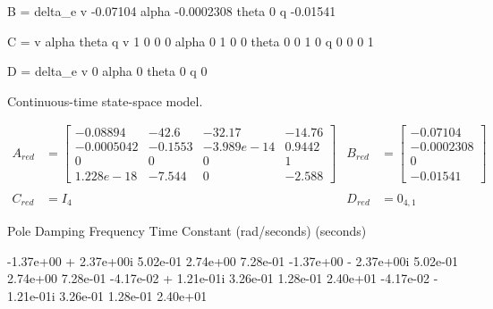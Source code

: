   B = 
             delta_e
   v        -0.07104
   alpha  -0.0002308
   theta           0
   q        -0.01541
 
  C = 
              v  alpha  theta      q
   v          1      0      0      0
   alpha      0      1      0      0
   theta      0      0      1      0
   q          0      0      0      1
 
  D = 
          delta_e
   v            0
   alpha        0
   theta        0
   q            0
 
Continuous-time state-space model.

\begin{equation}
    \label{eq:closedloopsystem}
    \begin{aligned}
        A_{red}&=\begin{bmatrix}
            -0.08894    &  -42.6   &   -32.17    &  -14.76   \\
            -0.0005042  &  -0.1553 & -3.989e-14  &    0.9442 \\
                     0  &        0 &          0  &         1 \\
             1.228e-18  &   -7.544 &          0  &    -2.588
        \end{bmatrix} &
        B_{red}&=\begin{bmatrix}
              -0.07104 \\
            -0.0002308 \\
                     0 \\
              -0.01541
        \end{bmatrix} \\\\
        C_{red}&=I_4 &
        D_{red}&=0_{4,1}
    \end{aligned}
\end{equation}

                                                                       
Pole              Damping       Frequency      Time Constant  
(rad/seconds)      (seconds)    
                                 
  
-1.37e+00 + 2.37e+00i     5.02e-01       2.74e+00         7.28e-01    
-1.37e+00 - 2.37e+00i     5.02e-01       2.74e+00         7.28e-01 
-4.17e-02 + 1.21e-01i     3.26e-01       1.28e-01         2.40e+01  
-4.17e-02 - 1.21e-01i     3.26e-01       1.28e-01         2.40e+01     

